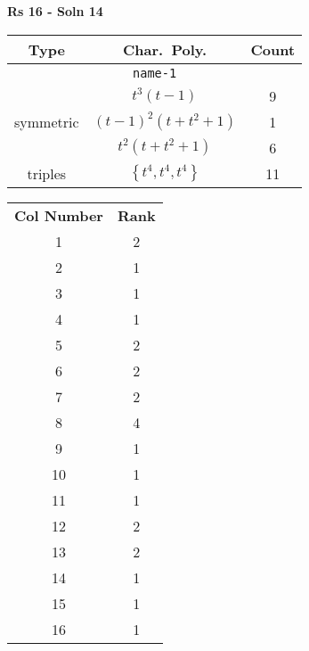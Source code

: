 \documentclass{article}
\begin{document}
    \textbf{Rs 16 - Soln 14}
    \begin{table}
    \begin{tabular}{|c|c|c|}
    \hline
    \textbf{Type} & \textbf{Char.~Poly.} & \textbf{Count} \\
    \hline \multicolumn{3}{|c|}{\texttt{name-1}} \\ \hline
    \multirow{3}{*}{symmetric}
    & $t^3(t - 1)$ & 9 \\
    & $(t - 1)^2(t + t^2 + 1)$ & 1 \\
    & $t^2(t + t^2 + 1)$ & 6 \\
    \hline
    \multirow{1}{*}{triples}
    & $\left\{t^4,t^4,t^4\right\}$ & 11 \\
    \hline
    \end{tabular}
    \end{table}
    \begin{table}
    \begin{tabular}{|c|c|}
    \hline
    \textbf{Col Number} & \textbf{Rank}\\
    1 & 2 \\ 
    2 & 1 \\ 
    3 & 1 \\ 
    4 & 1 \\ 
    5 & 2 \\ 
    6 & 2 \\ 
    7 & 2 \\ 
    8 & 4 \\ 
    9 & 1 \\ 
    10 & 1 \\ 
    11 & 1 \\ 
    12 & 2 \\ 
    13 & 2 \\ 
    14 & 1 \\ 
    15 & 1 \\ 
    16 & 1 \\ 
    \hline
    \end{tabular}
    \end{table}
    \newpage
\end{document}
